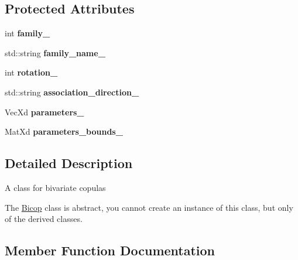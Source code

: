 \subsection*{Protected Attributes}
\begin{DoxyCompactItemize}
\item 
int {\bfseries family\+\_\+}\hypertarget{class_bicop_a3d546f9b8c6507002cae18b9fdcb4544}{}\label{class_bicop_a3d546f9b8c6507002cae18b9fdcb4544}

\item 
std\+::string {\bfseries family\+\_\+name\+\_\+}\hypertarget{class_bicop_ae87af8dcf838aa9342baf814f1a9c0c7}{}\label{class_bicop_ae87af8dcf838aa9342baf814f1a9c0c7}

\item 
int {\bfseries rotation\+\_\+}\hypertarget{class_bicop_a606833e2ea1d17a318dd20d67d01b40a}{}\label{class_bicop_a606833e2ea1d17a318dd20d67d01b40a}

\item 
std\+::string {\bfseries association\+\_\+direction\+\_\+}\hypertarget{class_bicop_a407914da267317da3f588632e4b95aa3}{}\label{class_bicop_a407914da267317da3f588632e4b95aa3}

\item 
Vec\+Xd {\bfseries parameters\+\_\+}\hypertarget{class_bicop_ade78fec591e6699a808b63104709b23a}{}\label{class_bicop_ade78fec591e6699a808b63104709b23a}

\item 
Mat\+Xd {\bfseries parameters\+\_\+bounds\+\_\+}\hypertarget{class_bicop_aa1253f11c251ea6d9f4020317e4346ab}{}\label{class_bicop_aa1253f11c251ea6d9f4020317e4346ab}

\end{DoxyCompactItemize}


\subsection{Detailed Description}
A class for bivariate copulas

The \hyperlink{class_bicop}{Bicop} class is abstract, you cannot create an instance of this class, but only of the derived classes. 

\subsection{Member Function Documentation}
